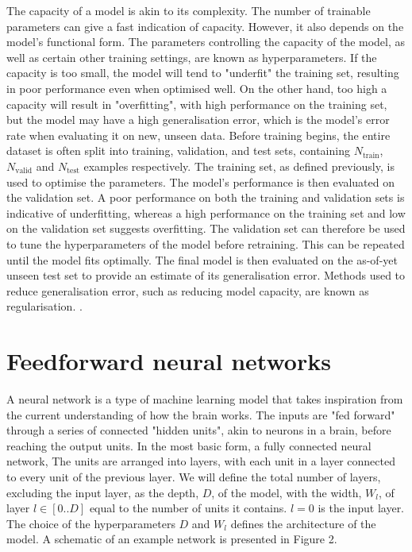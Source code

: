 \documentclass[12pt]{article}
\begin{document}
The capacity of a model is akin to its complexity. The number of trainable parameters can give a fast indication of capacity. However, it also depends on the model's functional form. The parameters controlling the capacity of the model, as well as certain other training settings, are known as hyperparameters. If the capacity is too small, the model will tend to "underfit" the training set, resulting in poor performance even when optimised well. On the other hand, too high a capacity will result in "overfitting", with high performance on the training set, but the model may have a high generalisation error, which is the model's error rate when evaluating it on new, unseen data. Before training begins, the entire dataset is often split into training, validation, and test sets, containing $N_{\mathrm{train}}$, $N_{\mathrm{valid}}$ and $N_{\mathrm{test}}$ examples respectively. The training set, as defined previously, is used to optimise the parameters. The model's performance is then evaluated on the validation set. A poor performance on both the training and validation sets is indicative of underfitting, whereas a high performance on the training set and low on the validation set suggests overfitting. The validation set can therefore be used to tune the hyperparameters of the model before retraining. This can be repeated until the model fits optimally. The final model is then evaluated on the as-of-yet unseen test set to provide an estimate of its generalisation error. Methods used to reduce generalisation error, such as reducing model capacity, are known as regularisation. \cite{Goodfellow16}.
\section{Feedforward neural networks}
A neural network is a type of machine learning model that takes inspiration from the current understanding of how the brain works. The inputs are "fed forward" through a series of connected "hidden units", akin to neurons in a brain, before reaching the output units. In the most basic form, a fully connected neural network, The units are arranged into layers, with each unit in a layer connected to every unit of the previous layer. We will define the total number of layers, excluding the input layer, as the depth, $D$, of the model, with the width, $W_l$, of layer $l\in[0..D]$ equal to the number of units it contains. $l=0$ is the input layer. The choice of the hyperparameters $D$ and $W_l$ defines the architecture of the model. A schematic of an example network is presented in Figure 2. 
\end{document}

